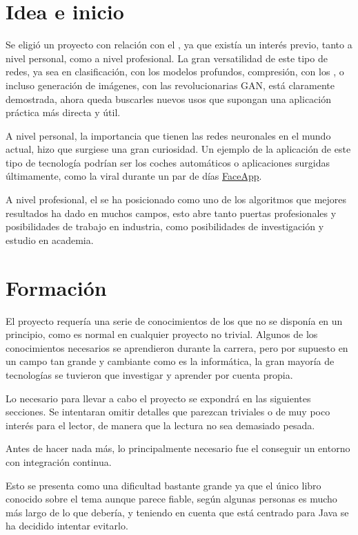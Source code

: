 
\section{Idea e inicio}

Se eligió un proyecto con relación con el , ya que existía un interés previo, tanto a nivel personal, como a nivel profesional. La gran versatilidad de este tipo de redes, ya sea en clasificación, con los modelos profundos, compresión, con los , o incluso generación de imágenes, con las revolucionarias GAN, está claramente demostrada, ahora queda buscarles nuevos usos que supongan una aplicación práctica más directa y útil. 

A nivel personal, la importancia que tienen las redes neuronales en el mundo actual, hizo que surgiese una gran curiosidad. Un ejemplo de la aplicación de este tipo de tecnología podrían ser los coches automáticos o aplicaciones surgidas últimamente, como la viral durante un par de días \href{https://www.faceapp.com/}{FaceApp}. 

A nivel profesional, el  se ha posicionado como uno de los algoritmos que mejores resultados ha dado en muchos campos, esto abre tanto puertas profesionales y posibilidades de trabajo en industria, como posibilidades de investigación y estudio en academia. 



\section{Formación}
El proyecto requería una serie de conocimientos de los que no se disponía en un principio, como es normal en cualquier proyecto no trivial. Algunos de los conocimientos necesarios se aprendieron durante la carrera, pero por supuesto en un campo tan grande y cambiante como es la informática, la gran mayoría de tecnologías se tuvieron que investigar y aprender por cuenta propia.

Lo necesario para llevar a cabo el proyecto se expondrá en las siguientes secciones. Se intentaran omitir detalles que parezcan triviales o de muy poco interés para el lector, de manera que la lectura no sea demasiado pesada.

Antes de hacer nada más, lo principalmente necesario fue el conseguir un entorno con integración continua. 

Esto se presenta como una dificultad bastante grande ya que el único libro conocido sobre el tema \cite{cont07} aunque parece fiable, según algunas personas es mucho más largo de lo que debería, y teniendo en cuenta que está centrado para Java se ha decidido intentar evitarlo.

